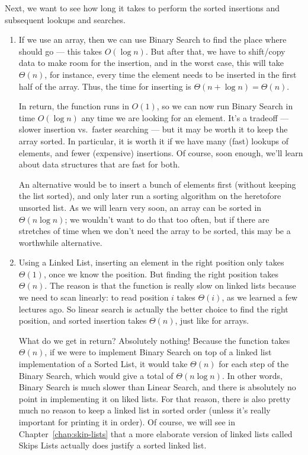 Next, we want to see how long it takes to perform the sorted
insertions and subsequent lookups and searches.
\begin{enumerate}
\item If we use an array, then we can use Binary Search to find the place
where  should go --- this takes $O(\log n)$. But after
that, we have to shift/copy data to make room for the insertion, and
in the worst case, this will take $\Theta(n)$, for instance, every
time the element needs to be inserted in the first half of the array.
Thus, the time for inserting is $\Theta(n + \log n) = \Theta(n)$.

In return, the  function runs in $O(1)$, so we can now run
Binary Search in time $O(\log n)$ any time we are looking for an
element.
It's a tradeoff --- slower insertion vs.~faster searching --- but it
may be worth it to keep the array sorted. In particular, it is worth
it if we have many (fast) lookups of elements, and fewer (expensive)
insertions. Of course, soon enough, we'll learn about data structures
that are fast for both.

An alternative would be to insert a bunch of elements first (without
keeping the list sorted), and only later run a sorting algorithm on
the heretofore unsorted list. As we will learn very soon, an
array can be sorted in $\Theta(n \log n)$; we wouldn't want to do
that too often, but if there are stretches of time when we don't need
the array to be sorted, this may be a worthwhile alternative.

\item Using a Linked List, inserting an element in the right position
  only takes $\Theta(1)$, once we know the position.
But finding the right position takes $\Theta(n)$. 
The reason is that the  function is really slow on linked
lists because we need to scan linearly: to read position $i$ takes
$\Theta(i)$, as we learned a few lectures ago.
So linear search is actually the better choice to find the right
position, and sorted insertion takes $\Theta(n)$, just like for
arrays.

What do we get in return? Absolutely nothing! Because the 
function takes $\Theta(n)$, if we were to implement Binary Search on
top of a linked list implementation of a Sorted List, it would take 
$\Theta(n)$ for each step of the Binary Search, which would give a
total of $\Theta(n \log n)$. In other words, Binary Search is much
slower than Linear Search, and there is absolutely no point in
implementing it on liked lists.
For that reason, there is also pretty much no reason to keep a linked
list in sorted order (unless it's really important for printing it in
order). Of course, we will see in Chapter~\ref{chap:skip-lists} that a
more elaborate version of linked lists called Skips Lists actually
does justify a sorted linked list.
\end{enumerate}
